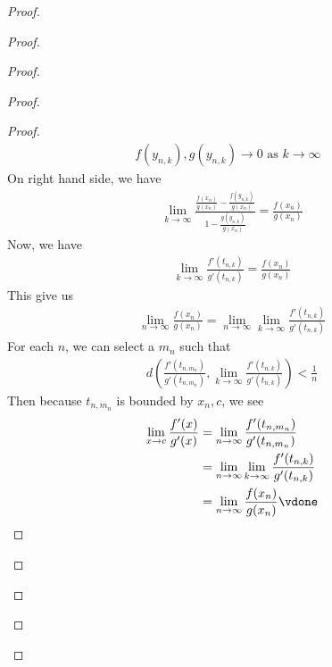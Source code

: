 \documentclass{report}
\begin{document}
\begin{proof}
\begin{proof}
\begin{proof}
\begin{proof}
\begin{proof}
\begin{align*}
f(y_{n,k}),g(y_{n,k})\to 0\text{ as $k \to \infty$ }
\end{align*}
On right hand side, we have 
\begin{align*}
\lim_{k\to \infty} \frac{\frac{f(x_n)}{g(x_n)}-\frac{f(y_{n,k})}{g(x_n)}}{1-\frac{g(y_{n,k})}{g(x_n)}}=\frac{f(x_n)}{g(x_n)}
\end{align*}
Now, we have 
\begin{align*}
\lim_{k \to \infty}\frac{f'(t_{n,k})}{g'(t_{n,k})}=\frac{f(x_n)}{g(x_n)}
\end{align*}
This give us 
\begin{align*}
\lim_{n \to \infty }\frac{f(x_n)}{g(x_n)}=\lim_{n \to \infty}\lim_{k \to \infty}\frac{f'(t_{n,k})}{g'(t_{n,k})}
\end{align*}
For each $n$, we can select a  $m_n$ such that 
\begin{align*}
d(\frac{f'(t_{n,m_n})}{g'(t_{n,m_n})},\lim_{k \to \infty}\frac{f'(t_{n,k})}{g'(t_{n,k})})<\frac{1}{n}
\end{align*}
Then because $t_{n,m_n}$ is bounded by $x_n,c$, we see 
 \begin{align*}
\lim_{x \to c} \frac{f'(x)}{g'(x)}&=\lim_{n \to \infty}\frac{f'(t_{n,m_n})}{g'(t_{n,m_n})}\\
&=\lim_{n \to \infty}\lim_{k \to\infty}\frac{f'(t_{n,k})}{g'(t_{n,k})}\\
&=\lim_{n\to \infty} \frac{f(x_n)}{g(x_n)}\vdone
\end{align*}







\end{proof}

\end{proof}
\end{proof}
\end{proof}
\end{proof}
\end{document}
